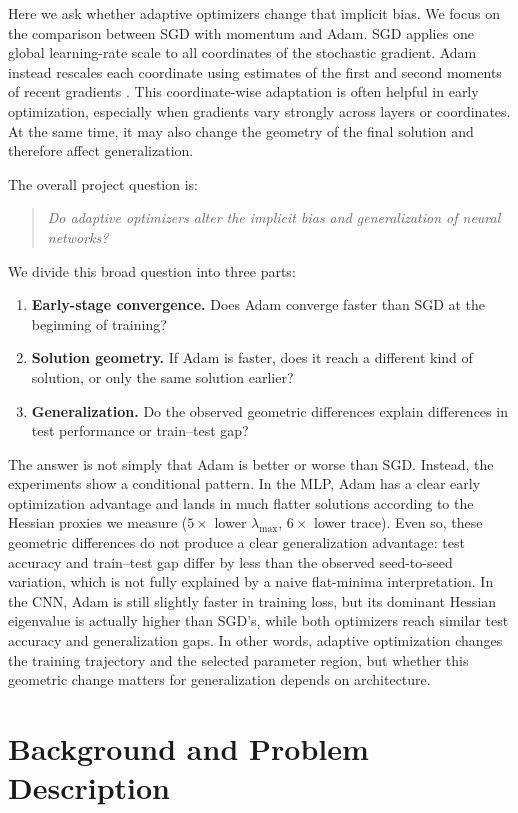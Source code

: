 \documentclass[11pt]{article}
\begin{document}
Here we ask whether adaptive optimizers change that implicit bias. We focus on the comparison between SGD with momentum and Adam. SGD applies one global learning-rate scale to all coordinates of the stochastic gradient. Adam instead rescales each coordinate using estimates of the first and second moments of recent gradients \cite{kingma2015adam}. This coordinate-wise adaptation is often helpful in early optimization, especially when gradients vary strongly across layers or coordinates. At the same time, it may also change the geometry of the final solution and therefore affect generalization.

The overall project question is:
\begin{quote}
\emph{Do adaptive optimizers alter the implicit bias and generalization of neural networks?}
\end{quote}
We divide this broad question into three parts:
\begin{enumerate}
    \item \textbf{Early-stage convergence.} Does Adam converge faster than SGD at the beginning of training?
    \item \textbf{Solution geometry.} If Adam is faster, does it reach a different kind of solution, or only the same solution earlier?
    \item \textbf{Generalization.} Do the observed geometric differences explain differences in test performance or train--test gap?
\end{enumerate}

The answer is not simply that Adam is better or worse than SGD. Instead, the experiments show a conditional pattern. In the MLP, Adam has a clear early optimization advantage and lands in much flatter solutions according to the Hessian proxies we measure ($5\times$ lower $\lambda_{\max}$, $6\times$ lower trace). Even so, these geometric differences do not produce a clear generalization advantage: test accuracy and train--test gap differ by less than the observed seed-to-seed variation, which is not fully explained by a naive flat-minima interpretation. In the CNN, Adam is still slightly faster in training loss, but its dominant Hessian eigenvalue is actually higher than SGD's, while both optimizers reach similar test accuracy and generalization gaps. In other words, adaptive optimization changes the training trajectory and the selected parameter region, but whether this geometric change matters for generalization depends on architecture.

\section{Background and Problem Description}
\end{document}
